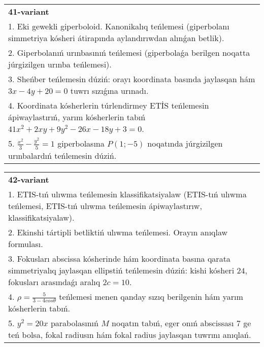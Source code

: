 \documentclass{article}
\begin{document}
\begin{tabular}{m{17cm}}
\textbf{41-variant}\\
1. Eki gewekli giperboloid. Kanonikalıq teńlemesi (giperbolanı simmetriya kósheri átirapında aylandırıwdan alınǵan betlik).\\

2. Giperbolanıń urınbasınıń teńlemesi (giperbolaǵa berilgen noqatta júrgizilgen urınba teńlemesi).\\

3. Sheńber teńlemesin dúziń: orayı koordinata basında jaylasqan hám $3 x-4 y+20=0$ tuwrı sızıǵına urınadı.\\

4. Koordinata kósherlerin túrlendirmey ETİS teńlemesin ápiwaylastırıń, yarım kósherlerin tabıń $41x^{2} + 2xy + 9y^{2} - 26x - 18y + 3 = 0$.  \\

5. $\frac{x^{2}}{3} - \frac{y^{2}}{5} = 1$ giperbolasına $P(1; - 5)$ noqatında júrgizilgen urınbalardıń teńlemesin dúziń.
\end{tabular}
\vspace{1cm}


\begin{tabular}{m{17cm}}
\textbf{42-variant}\\
1. ETIS-tıń ulıwma teńlemesin klassifikatsiyalaw (ETIS-tıń ulıwma teńlemesi, ETIS-tıń ulıwma teńlemesin ápiwaylastırıw, klassifikatsiyalaw).\\

2. Ekinshi tártipli betliktiń ulıwma teńlemesi. Orayın anıqlaw formulası.\\

3. Fokusları abscissa kósherinde hám koordinata basına qarata simmetriyalıq jaylasqan ellipstiń teńlemesin dúziń: kishi kósheri $24$, fokusları arasındaǵı aralıq $2 c=10$.\\

4. $\rho = \frac{5}{3 - 4cos\theta}$ teńlemesi menen qanday sızıq berilgenin hám yarım kósherlerin tabıń.  \\

5. $y^{2} = 20x$ parabolasınıń $M$ noqatın tabıń, eger onıń abscissası 7 ge teń bolsa, fokal radiusın hám fokal radius jaylasqan tuwrını anıqlań.
\end{tabular}
\vspace{1cm}
\end{document}
